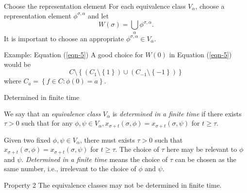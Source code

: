 \begin{frame}[t]{Choose the representation element} 
  For each equivalence class $V_\alpha$, choose a representation element $\phi^{\sigma,\alpha}$ and let 
  \begin{equation}
    W(\sigma)=\bigcup_{\alpha} \phi^{\sigma,\alpha}.
  \end{equation}
  It is important to choose an appropriate $\phi^{\sigma,\alpha} \in V_{\alpha}$.
  \begin{exampleblock}{Example: Equation (\ref{eqn-5})}
    A good choice for $W(0)$ in Equation (\ref{eqn-5}) would be 
    \[
      C\setminus \left\{\left( C_1\setminus \left\{1\right\}  \right) \cup \left( C_{-1}\setminus \left\{-1\right\}  \right) \right\} 
    \]
    where $C_a = \left\{f\in C:\phi(0)=a\right\} $.
  \end{exampleblock}
\end{frame}

\begin{frame}[t]{Determined in finite time }
  \begin{definition}
    We say that an \textit{equivalence class} $V_\alpha$ is \textit{determined in a finite time } if there exists $\tau >0$ such that for any $\phi,\psi\in V_\alpha,x_{\sigma+t}(\sigma,\phi)=x_{\sigma+t}(\sigma,\psi)$ for $t\ge \tau $.
  \end{definition}
  Given two fixed $\phi,\psi \in V_\alpha$, there must exists $\tau >0$ such that $x_{\sigma+t }(\sigma,\phi)=x_{\sigma+t}(\sigma,\psi)$ for $t\ge \tau $. The choice of $\tau $ here may be relevant to $\phi$ and $\psi $. \textit{Determined in a finite time} means the choice of $\tau $ can be chosen as the same number, i.e., irrelevant to the choice of $\phi$ and $\psi$. 
  \begin{alertblock}{Property 2}
    The equivalence classes may not be determined in finite time.
  \end{alertblock}
\end{frame}

